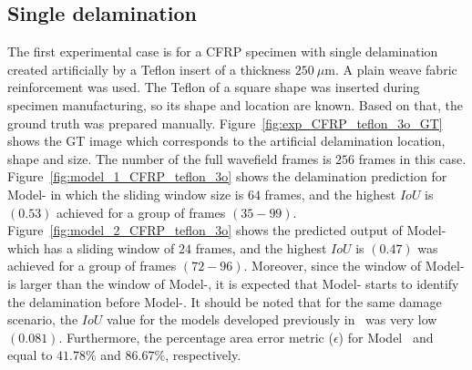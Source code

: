 \subsection{Single delamination}
The first experimental case is for a CFRP specimen with single delamination created artificially by a Teflon insert of a thickness \(250\ \mu\)m. 
A plain weave fabric reinforcement was used.
The Teflon of a square shape was inserted during specimen manufacturing, so its shape and location are known.
Based on that, the ground truth was prepared manually.
Figure~\ref{fig:exp_CFRP_teflon_3o_GT} shows the GT image which corresponds to the artificial delamination location, shape and size.
The number of the full wavefield frames is \(256\) frames in this case.
Figure~\ref{fig:model_1_CFRP_teflon_3o} shows the delamination prediction for Model- in which the sliding window size is \(64\) frames, and the highest \(IoU\) is \((0.53)\) achieved for a group of frames \((35-99)\).
Figure~\ref{fig:model_2_CFRP_teflon_3o} shows the predicted output of Model- which has a sliding window of \(24\) frames, and the highest \(IoU\) is \((0.47)\) was achieved for a group of frames \((72-96)\).
Moreover, since the window of Model- is larger than the window of Model-, it is expected that Model- starts to identify the delamination before Model-.
It should be noted that for the same damage scenario, the \(IoU\) value for the models developed previously in~\cite{Ijjeh2021} was very low \((0.081)\).
Furthermore, the percentage area error metric (\(\epsilon\)) for Model~ and~ equal to \(41.78 \%\) and \(86.67\%\), respectively.

